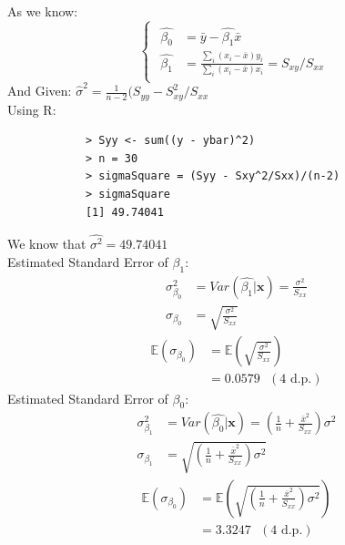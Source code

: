 \documentclass[a4paper]{article}
\begin{document}
	\subsection{}
		As we know:
		\[\begin{cases}
			\begin{split}
				\hat{\beta_0} &= \bar{y} - \hat{\beta_1}\bar{x}\\
				\hat{\beta_1} &= \frac{\sum_i (x_i - \bar{x})y_i}{\sum_i (x_i - \bar{x})x_i} = S_{xy}/S_{xx}
			\end{split}
		\end{cases}\]
		And Given: \(\hat{\sigma}^2 = \frac{1}{n-2}(S_{yy}-S_{xy}^2/S_{xx}\)\\
		Using R:
		\begin{verbatim}
			> Syy <- sum((y - ybar)^2)
			> n = 30
			> sigmaSquare = (Syy - Sxy^2/Sxx)/(n-2)
			> sigmaSquare
			[1] 49.74041
		\end{verbatim}
		We know that \(\hat{\sigma^2} = 49.74041\)\\
		Estimated Standard Error of \(\beta_1\):
			\begin{equation*}
				\begin{split}
					\sigma_{\beta_0}^2 &= Var(\hat{\beta_1}|\textbf{x}) = \frac{\sigma^2}{S_{xx}}\\
					\sigma_{\beta_0} &= \sqrt{\frac{\sigma^2}{S_{xx}}}
				\end{split}
			\end{equation*}
			\begin{equation*}
				\begin{split}
					\mathbb{E}(\sigma_{\beta_0}) &= \mathbb{E}\left(\sqrt{\frac{\sigma^2}{S_{xx}}}\right)\\
					&= 0.0579 \text{ }(4 \text{ d.p.})
				\end{split}
			\end{equation*}
		Estimated Standard Error of \(\beta_0\):
		\begin{equation*}
			\begin{split}
				\sigma_{\beta_1}^2 &= Var(\hat{\beta_0}|\textbf{x}) = \left(\frac{1}{n}+\frac{\bar{x}^2}{S_{xx}}\right)\sigma^2\\
				\sigma_{\beta_1} &= \sqrt{\left(\frac{1}{n}+\frac{\bar{x}^2}{S_{xx}}\right)\sigma^2}
			\end{split}
		\end{equation*}
		\begin{equation*}
			\begin{split}
				\mathbb{E}(\sigma_{\beta_0}) &= \mathbb{E}\left(\sqrt{\left(\frac{1}{n}+\frac{\bar{x}^2}{S_{xx}}\right)\sigma^2}\right)\\
				&= 3.3247 \text{ }(4 \text{ d.p.})
			\end{split}
		\end{equation*}
\end{document}

